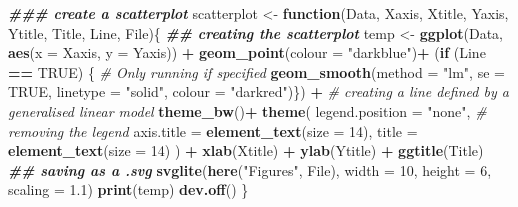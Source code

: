 \documentclass[
]{article}
\newenvironment{Shaded}{\begin{snugshade}}{\end{snugshade}}
\newcommand{\AttributeTok}[1]{\textcolor[rgb]{0.13,0.29,0.53}{#1}}
\newcommand{\CommentTok}[1]{\textcolor[rgb]{0.56,0.35,0.01}{\textit{#1}}}
\newcommand{\ConstantTok}[1]{\textcolor[rgb]{0.56,0.35,0.01}{#1}}
\newcommand{\ControlFlowTok}[1]{\textcolor[rgb]{0.13,0.29,0.53}{\textbf{#1}}}
\newcommand{\DecValTok}[1]{\textcolor[rgb]{0.00,0.00,0.81}{#1}}
\newcommand{\DocumentationTok}[1]{\textcolor[rgb]{0.56,0.35,0.01}{\textbf{\textit{#1}}}}
\newcommand{\FloatTok}[1]{\textcolor[rgb]{0.00,0.00,0.81}{#1}}
\newcommand{\FunctionTok}[1]{\textcolor[rgb]{0.13,0.29,0.53}{\textbf{#1}}}
\newcommand{\NormalTok}[1]{#1}
\newcommand{\OtherTok}[1]{\textcolor[rgb]{0.56,0.35,0.01}{#1}}
\newcommand{\SpecialCharTok}[1]{\textcolor[rgb]{0.81,0.36,0.00}{\textbf{#1}}}
\newcommand{\StringTok}[1]{\textcolor[rgb]{0.31,0.60,0.02}{#1}}
\begin{document}
\begin{Shaded}
\begin{Highlighting}[]
\DocumentationTok{\#\#\# create a scatterplot}
\NormalTok{scatterplot }\OtherTok{\textless{}{-}} \ControlFlowTok{function}\NormalTok{(Data, Xaxis, Xtitle, Yaxis, Ytitle, Title, Line, File)\{}
  \DocumentationTok{\#\# creating the scatterplot}
\NormalTok{  temp }\OtherTok{\textless{}{-}} \FunctionTok{ggplot}\NormalTok{(Data, }\FunctionTok{aes}\NormalTok{(}\AttributeTok{x =}\NormalTok{ Xaxis, }\AttributeTok{y =}\NormalTok{ Yaxis)) }\SpecialCharTok{+}
    \FunctionTok{geom\_point}\NormalTok{(}\AttributeTok{colour =} \StringTok{"darkblue"}\NormalTok{)}\SpecialCharTok{+}
\NormalTok{    (}\ControlFlowTok{if}\NormalTok{ (Line }\SpecialCharTok{==} \ConstantTok{TRUE}\NormalTok{) \{ }\CommentTok{\# Only running if specified}
      \FunctionTok{geom\_smooth}\NormalTok{(}\AttributeTok{method =} \StringTok{"lm"}\NormalTok{, }\AttributeTok{se =} \ConstantTok{TRUE}\NormalTok{, }\AttributeTok{linetype =} \StringTok{"solid"}\NormalTok{, }
                  \AttributeTok{colour =} \StringTok{"darkred"}\NormalTok{)\}) }\SpecialCharTok{+} \CommentTok{\# creating a line defined by a generalised linear model}
    \FunctionTok{theme\_bw}\NormalTok{()}\SpecialCharTok{+}
    \FunctionTok{theme}\NormalTok{(}
      \AttributeTok{legend.position =} \StringTok{"none"}\NormalTok{, }\CommentTok{\# removing the legend}
      \AttributeTok{axis.title =} \FunctionTok{element\_text}\NormalTok{(}\AttributeTok{size =} \DecValTok{14}\NormalTok{),}
      \AttributeTok{title =} \FunctionTok{element\_text}\NormalTok{(}\AttributeTok{size =} \DecValTok{14}\NormalTok{)}
\NormalTok{    ) }\SpecialCharTok{+}
    \FunctionTok{xlab}\NormalTok{(Xtitle) }\SpecialCharTok{+}
    \FunctionTok{ylab}\NormalTok{(Ytitle) }\SpecialCharTok{+}
    \FunctionTok{ggtitle}\NormalTok{(Title)}
  \DocumentationTok{\#\# saving as a .svg}
  \FunctionTok{svglite}\NormalTok{(}\FunctionTok{here}\NormalTok{(}\StringTok{"Figures"}\NormalTok{, File), }\AttributeTok{width =} \DecValTok{10}\NormalTok{,}
          \AttributeTok{height =} \DecValTok{6}\NormalTok{,}
          \AttributeTok{scaling =} \FloatTok{1.1}\NormalTok{)}
  \FunctionTok{print}\NormalTok{(temp)}
  \FunctionTok{dev.off}\NormalTok{()}
\NormalTok{\}}


\end{Highlighting}
\end{Shaded}
\end{document}
